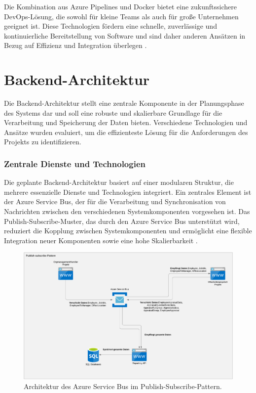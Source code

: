 Die Kombination aus Azure Pipelines und Docker bietet eine zukunftssichere DevOps-Lösung, die sowohl für kleine Teams als auch für große Unternehmen geeignet ist. Diese Technologien fördern eine schnelle, zuverlässige und kontinuierliche Bereitstellung von Software und sind daher anderen Ansätzen in Bezug auf Effizienz und Integration überlegen \cite{azureDockerIntegration}.



\section{Backend-Architektur}
Die Backend-Architektur stellt eine zentrale Komponente in der Planungsphase des Systems dar und soll eine robuste und skalierbare Grundlage für die Verarbeitung und Speicherung der Daten bieten. Verschiedene Technologien und Ansätze wurden evaluiert, um die effizienteste Lösung für die Anforderungen des Projekts zu identifizieren.

\subsubsection*{Zentrale Dienste und Technologien}
Die geplante Backend-Architektur basiert auf einer modularen Struktur, die mehrere essenzielle Dienste und Technologien integriert. Ein zentrales Element ist der Azure Service Bus, der für die Verarbeitung und Synchronisation von Nachrichten zwischen den verschiedenen Systemkomponenten vorgesehen ist. Das Publish-Subscribe-Muster, das durch den Azure Service Bus unterstützt wird, reduziert die Kopplung zwischen Systemkomponenten und ermöglicht eine flexible Integration neuer Komponenten sowie eine hohe Skalierbarkeit \cite{azureServiceBus2024}.

\begin{figure}[H]
    \centering
    \includegraphics[width=1.0\textwidth, keepaspectratio]{images/Azure (2019) framework - Page 1.png}
    \caption{Architektur des Azure Service Bus im Publish-Subscribe-Pattern.}
    \label{fig:azure_bus_architecture}
\end{figure}

